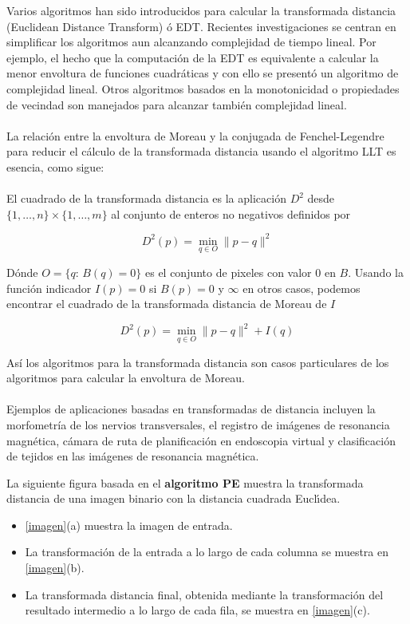 Varios algoritmos han sido introducidos para calcular la transformada distancia (Euclidean Distance Transform) \'o EDT. Recientes 
investigaciones se centran en simplificar los algoritmos aun alcanzando complejidad de tiempo lineal. Por ejemplo, el hecho que la
computaci\'on de la EDT es equivalente a calcular la menor envoltura de funciones cuadr\'aticas y con ello se present\'o un algoritmo de
complejidad lineal. Otros algoritmos basados en la monotonicidad o propiedades de vecindad son manejados para alcanzar tambi\'en complejidad
lineal.\\\\

La relaci\'on entre la envoltura de Moreau y la conjugada de Fenchel-Legendre para reducir el c\'alculo de la transformada distancia usando 
el algoritmo LLT es esencia, como sigue:\\ \\

El cuadrado de la transformada distancia es la aplicaci\'on $ D^2 $ desde $ \{1, \ldots , n\} \times \{1, \ldots , m\} $ al conjunto de 
enteros no negativos definidos por 

\[D^2(p) = \min_{q \in O} \parallel p - q \parallel^2\]

D\'onde $ O = \{q:\, B(q) = 0\} $ es el conjunto de pixeles con valor $0$ en $B.$ Usando la funci\'on indicador $ I(p) = 0 $ si $ B(p) = 0 $
y $ \infty $ en otros casos, podemos encontrar el cuadrado de la transformada distancia de Moreau de $I$

\[D^2(p) = \min_{q \in O} \parallel p - q \parallel^2 + I(q)\]


As\'i los algoritmos para la transformada distancia son casos particulares de los algoritmos para calcular la envoltura de Moreau.\\ \\

Ejemplos de aplicaciones basadas en transformadas de distancia incluyen la morfometr\'ia de los nervios transversales, el registro de
im\'agenes de resonancia magn\'etica, c\'amara de ruta de planificaci\'on en endoscopia virtual y clasificaci\'on de tejidos en las 
im\'agenes de resonancia magn\'etica.\medskip

La siguiente figura basada en el \textbf{algoritmo PE} muestra la transformada distancia de una imagen binario con la distancia cuadrada
Euclı́dea.

\begin{itemize}
   \item \ref{imagen}(a) muestra la imagen de entrada.
   \item La transformación de la entrada a lo largo de cada columna se muestra en \ref{imagen}(b).
   \item La transformada distancia final, obtenida mediante la transformación del resultado intermedio a lo largo de cada fila, se muestra 
	 en \ref{imagen}(c).
\end{itemize}

